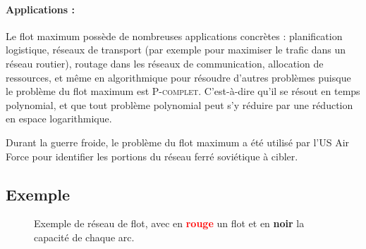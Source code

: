 \documentclass[a4paper]{article}
\begin{document}
\paragraph{Applications :} Le flot maximum possède de nombreuses applications concrètes : planification logistique, réseaux de transport (par exemple pour maximiser le trafic dans un réseau routier), routage dans les réseaux de communication, allocation de ressources, et même en algorithmique pour résoudre d’autres problèmes puisque le problème du flot maximum est \textsc{P-complet}. C'est-à-dire qu'il se résout en temps polynomial, et que tout problème polynomial peut s'y réduire par une réduction en espace logarithmique\cite{GOLDSCHLAGER1982105}.

Durant la guerre froide, le problème du flot maximum a été utilisé par l'US Air Force pour identifier les portions du réseau ferré soviétique à cibler\cite{schrijver2002history}.
\subsection{Exemple}
\begin{figure}[H]
	\begin{center}
		\caption{Exemple de réseau de flot, avec en \textcolor{red}{\textbf{rouge}} un flot et en \textbf{noir} la capacité de chaque arc.}
	\end{center}
\end{figure}
\end{document}
